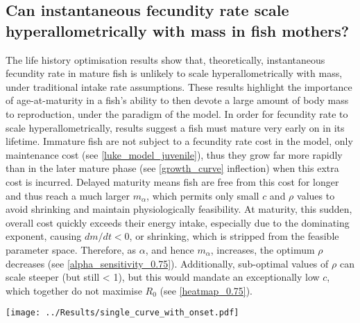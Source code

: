 \documentclass[a4paper]{article} %
\begin{document}
\subsection{Can instantaneous fecundity rate scale hyperallometrically with mass in fish mothers?}
The life history optimisation results show that, theoretically, instantaneous fecundity rate in mature fish is unlikely to scale hyperallometrically with mass, under traditional intake rate assumptions. These results highlight the importance of age-at-maturity in a fish's ability to then devote a large amount of body mass to reproduction, under the paradigm of the model. In order for fecundity rate to scale hyperallometrically, results suggest a fish must mature very early on in its lifetime. Immature fish are not subject to a fecundity rate cost in the model, only maintenance cost (see \cref{luke_model_juvenile}), thus they grow far more rapidly than in the later mature phase (see \cref{growth_curve} inflection) when this extra cost is incurred. Delayed maturity means fish are free from this cost for longer and thus reach a much larger $m_{\alpha}$, which permits only small $c$ and $\rho$ values to avoid shrinking and maintain physiologically feasibility. At maturity, this sudden, overall cost quickly exceeds their energy intake, especially due to the dominating exponent, causing $dm/dt < 0$, or shrinking, which is stripped from the feasible parameter space. Therefore, as $\alpha$, and hence $m_{\alpha}$, increases, the optimum $\rho$ decreases (see \cref{alpha_sensitivity_0.75}). Additionally, sub-optimal values of $\rho$ can scale steeper (but still < 1), but this would mandate an exceptionally low $c$, which together do not maximise $R_0$ (see \cref{heatmap_0.75}).

\begin{center}
    \begin{minipage}{0.8\linewidth}
        \texttt{[image: ../Results/single\_curve\_with\_onset.pdf]}
        \label{growth_curve}
    \end{minipage}\\
\end{center}
\end{document}
